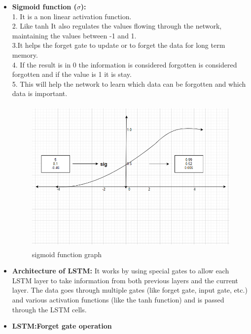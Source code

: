 \documentclass[openany,12pt]{report}
\begin{document}
\begin{itemize}
\item{\textbf{Sigmoid function ($\sigma$):}}\\
1. It is a non linear activation function.\\
2. Like tanh It also regulates the values flowing through the network, maintaining the values between -1 and 1.\\
3.It helps the forget gate to update or to forget the data for long term memory.\\
4. If the result is in 0 the information is considered forgotten is considered forgotten and if the value is 1 it is stay.\\
5. This will help the network to learn which data can be forgotten and which data is important.\\

\begin{figure}[H]
\centering
\includegraphics[width=5in,height=3in]{./sig.png}
\caption{sigmoid function graph}
\end{figure}

\item{\textbf{Architecture of LSTM:}}
It works by using special gates to allow each LSTM layer to take
information from both previous layers and the current layer.
The data goes through multiple gates (like forget gate, input
gate, etc.) and various activation functions (like the tanh
function) and is passed through the LSTM cells.\\

\item{\textbf{LSTM:Forget gate operation}}\\ 


\end{itemize}
\end{document}
